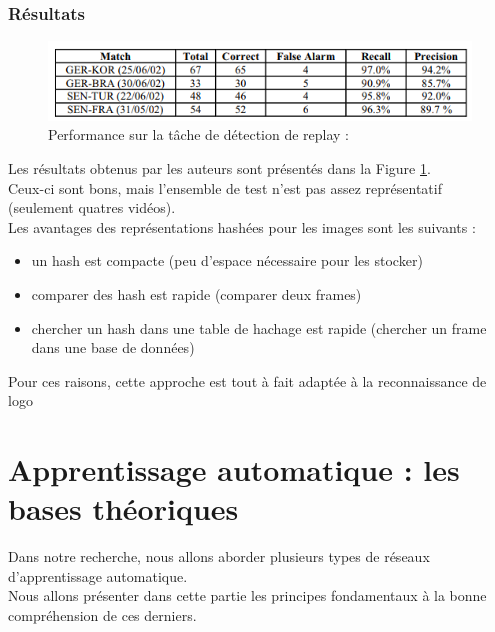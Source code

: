 \documentclass[11pt]{article}
\begin{document}
\subsubsection{Résultats}
\label{sec:orgc0ce9c8}
\begin{figure}[htbp]
\centering
\includegraphics[width=.9\linewidth]{mean_shift_res.png}
\caption{Performance sur la tâche de détection de replay :\label{mean-shift-res}}
\end{figure}
Les résultats obtenus par les auteurs sont présentés dans la Figure \ref{mean-shift-res}.\\
Ceux-ci sont bons, mais l'ensemble de test n'est pas assez représentatif (seulement quatres vidéos).\\
Les avantages des représentations hashées pour les images sont les suivants :\\
\begin{itemize}
\item un hash est compacte (peu d'espace nécessaire pour les stocker)\\
\item comparer des hash est rapide (comparer deux frames)\\
\item chercher un hash dans une table de hachage est rapide (chercher un frame dans une base de données)\\
\end{itemize}
Pour ces raisons, cette approche est tout à fait adaptée à la reconnaissance de logo\\

\newpage
\section{Apprentissage automatique : les bases théoriques}
\label{sec:org3f3e74d}
Dans notre recherche, nous allons aborder plusieurs types de réseaux d'apprentissage automatique.\\
Nous allons présenter dans cette partie les principes fondamentaux à la bonne compréhension de ces derniers.\\
\end{document}
